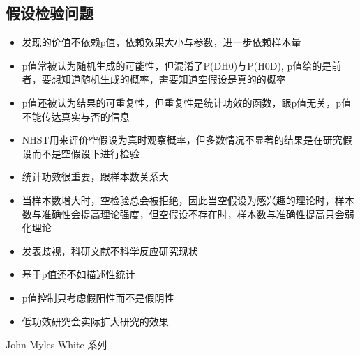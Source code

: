 \documentclass[]{book}
\providecommand{\tightlist}{%
  \setlength{\itemsep}{0pt}\setlength{\parskip}{0pt}}
\begin{document}
\subsection{假设检验问题}

\begin{itemize}
\tightlist
\item
  发现的价值不依赖p值，依赖效果大小与参数，进一步依赖样本量
\item
  p值常被认为随机生成的可能性，但混淆了P(D\textbar{}H0)与P(H0\textbar{}D),
  p值给的是前者，要想知道随机生成的概率，需要知道空假设是真的的概率
\item
  p值还被认为结果的可重复性，但重复性是统计功效的函数，跟p值无关，p值不能传达真实与否的信息
\item
  NHST用来评价空假设为真时观察概率，但多数情况不显著的结果是在研究假设而不是空假设下进行检验
\item
  统计功效很重要，跟样本数关系大
\item
  当样本数增大时，空检验总会被拒绝，因此当空假设为感兴趣的理论时，样本数与准确性会提高理论强度，但空假设不存在时，样本数与准确性提高只会弱化理论
\item
  发表歧视，科研文献不科学反应研究现状
\item
  基于p值还不如描述性统计
\item
  p值控制只考虑假阳性而不是假阴性
\item
  低功效研究会实际扩大研究的效果
\end{itemize}

John Myles White 系列
\end{document}
